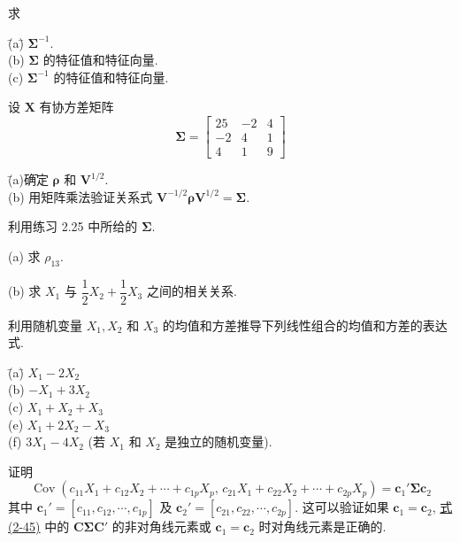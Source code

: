 \noindent 求
\begin{tabbing}
\hspace*{2em}\=(a)\quad \= $\boldsymbol{\Sigma}^{-1}$.\\[2pt]
\>(b)\> $\boldsymbol{\Sigma}$ 的特征值和特征向量.\\[2pt]
\>(c)\> $\boldsymbol{\Sigma}^{-1}$ 的特征值和特征向量.
\end{tabbing}

\medskip
{}\quad 设 $\mathbf{X}$ 有协方差矩阵
\[
\boldsymbol{\Sigma}=\begin{bmatrix}25&-2&4\\-2&4&1\\4&1&9\end{bmatrix}
\]
\begin{tabbing}
\hspace*{2em}\=(a)\quad \= 确定 $\boldsymbol{\rho}$ 和 $\mathbf{V}^{1/2}$.\\[2pt]
\>(b)\> 用矩阵乘法验证关系式 $\mathbf{V}^{-1/2}\boldsymbol{\rho}\mathbf{V}^{1/2}=\boldsymbol{\Sigma}$.
\end{tabbing}

\medskip
{}\quad 利用练习 2.25 中所给的 $\boldsymbol{\Sigma}$.

\noindent (a) 求 $\rho_{13}$.

\noindent (b) 求 $X_{1}$ 与 $\dfrac{1}{2}X_{2}+\dfrac{1}{2}X_{3}$ 之间的相关关系.

\medskip
{}\quad 利用随机变量 $X_{1},X_{2}$ 和 $X_{3}$ 的均值和方差推导下列线性组合的均值和方差的表达式.

\begin{tabbing}
\hspace*{2em}\=(a)\quad \= $X_{1}-2X_{2}$\\[2pt]
\>(b)\> $-X_{1}+3X_{2}$\\[2pt]
\>(c)\> $X_{1}+X_{2}+X_{3}$\\[2pt]
\>(e)\> $X_{1}+2X_{2}-X_{3}$\\[2pt]
\>(f)\> $3X_{1}-4X_{2}$ (若 $X_{1}$ 和 $X_{2}$ 是独立的随机变量).
\end{tabbing}

\medskip
{}\quad 证明
\[
\operatorname{Cov}(c_{11}X_{1}+c_{12}X_{2}+\cdots+c_{1p}X_{p},\,c_{21}X_{1}+c_{22}X_{2}+\cdots+c_{2p}X_{p})=\mathbf{c}_{1}'\boldsymbol{\Sigma}\mathbf{c}_{2}
\]
其中 $\mathbf{c}_{1}'=[c_{11},c_{12},\cdots,c_{1p}]$ 及 $\mathbf{c}_{2}'=[c_{21},c_{22},\cdots,c_{2p}]$. 这可以验证如果 $\mathbf{c}_{1}=\mathbf{c}_{2}$, \hyperref[eq:2-45]{式(2-45)} 中的 $\mathbf{C}\boldsymbol{\Sigma}\mathbf{C}'$ 的非对角线元素或 $\mathbf{c}_{1}=\mathbf{c}_{2}$ 时对角线元素是正确的.

